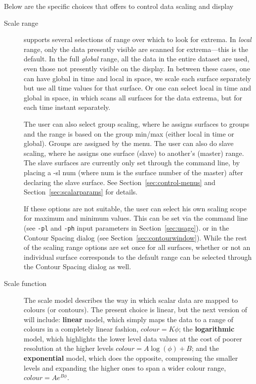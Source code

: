Below are the specific choices that \map{} offers to control data scaling
and display
\begin{description}
  
  \item[Scale range] \map{} supports several selections of range over which
    to look for extrema.  In {\em local\/} range, only the data presently
    visible are scanned for extrema---this is the default.  In the full
    {\em global\/} range, all the data in the entire dataset are used, even
    those not presently visible on the display.  In between these cases,
    one can have global in time and local in space, \ie{} we scale each
    surface separately but use all time values for that surface.  Or one
    can select local in time and global in space, in which \map{} scans all
    surfaces for the data extrema, but for each time instant separately.  

    The user can also select group
    scaling, where he assigns surfaces to groups and the range is based on
    the group min/max (either local in time or global).  Groups are
    assigned by the menu.  The user can also do slave scaling, where he
    assigns one surface (slave) to another's (master) range.  The slave
    surfaces are currently only set through the command line, by placing a
    -sl num (where num is the surface number of the master) after declaring
    the slave surface.  See Section~\ref{sec:control-menus} and
    Section~\ref{sec:scalarparams} for details.

    If these options are not suitable, the user can select his own scaling 
    scope for
    maximum and minimum values. This can be set via the command line 
    (see {\tt -pl} and {\tt -ph} input parameters in Section~\ref{sec:usage}).
    or in the Contour Spacing dialog (see Section~\ref{sec:contourwindow}).
    While the rest of the scaling range options are set once for all 
    surfaces, whether or not an individual surface corresponds to the
    default range can be selected through the Contour Spacing dialog as well.

        
  \item[Scale function] The scale model describes the way in which scalar
    data are mapped to colours (or contours).  The present choice is
    linear, but the next version of \map{} will include: \textbf{linear}
    model, which simply maps the data to a range of colours in a completely
    linear fashion, \ie{} \mbox{$colour = K \phi$}; the
    \textbf{logarithmic} model, which highlights the lower level data
    values at the cost of poorer resolution at the higher levels \ie{}
    \mbox{$colour = A\log(\phi) + B$}; and the \textbf{exponential} model,
    which does the opposite, compressing the smaller levels and expanding
    the higher ones to span a wider colour range, \ie{} \mbox{$colour = A
      e^{B\phi}$}.
    

\end{description}
